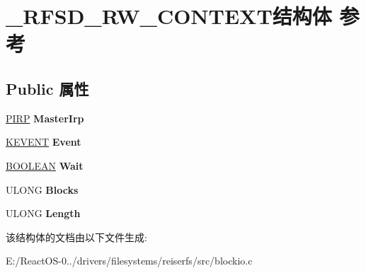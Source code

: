 \hypertarget{struct___r_f_s_d___r_w___c_o_n_t_e_x_t}{}\section{\+\_\+\+R\+F\+S\+D\+\_\+\+R\+W\+\_\+\+C\+O\+N\+T\+E\+X\+T结构体 参考}
\label{struct___r_f_s_d___r_w___c_o_n_t_e_x_t}
\subsection*{Public 属性}
\begin{DoxyCompactItemize}
\item 
\mbox{\label{struct___r_f_s_d___r_w___c_o_n_t_e_x_t_ad707f80da17f28fe24b2681d1bc4c57f}} 
\hyperlink{interfacevoid}{P\+I\+RP} {\bfseries Master\+Irp}
\item 
\mbox{\label{struct___r_f_s_d___r_w___c_o_n_t_e_x_t_a55ded45c01e11c1f0f3aa83d94226316}} 
\hyperlink{struct___k_e_v_e_n_t}{K\+E\+V\+E\+NT} {\bfseries Event}
\item 
\mbox{\label{struct___r_f_s_d___r_w___c_o_n_t_e_x_t_a0f6b67473ad757ccdb8f5b4aa48177eb}} 
\hyperlink{_processor_bind_8h_a112e3146cb38b6ee95e64d85842e380a}{B\+O\+O\+L\+E\+AN} {\bfseries Wait}
\item 
\mbox{\label{struct___r_f_s_d___r_w___c_o_n_t_e_x_t_a4d37849241c3f9a45813cc2b85567282}} 
U\+L\+O\+NG {\bfseries Blocks}
\item 
\mbox{\label{struct___r_f_s_d___r_w___c_o_n_t_e_x_t_ab47d5b0b7c03178a6e24c0601500ef8b}} 
U\+L\+O\+NG {\bfseries Length}
\end{DoxyCompactItemize}


该结构体的文档由以下文件生成\+:\begin{DoxyCompactItemize}
\item 
E\+:/\+React\+O\+S-\/0../drivers/filesystems/reiserfs/src/blockio.\+c\end{DoxyCompactItemize}
